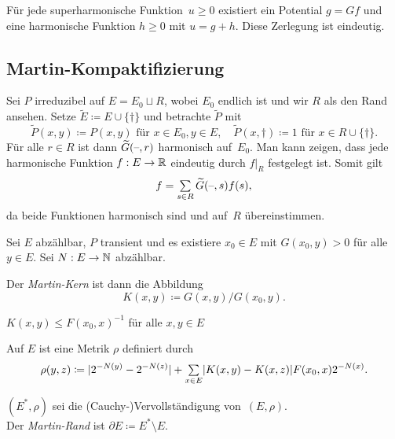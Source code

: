 \documentclass{cheat-sheet}
\begin{document}
\begin{satz}
  Für jede superharmonische Funktion~$u \geq 0$ existiert ein Potential $g = G f$ und eine harmonische Funktion $h \geq 0$ mit $u = g + h$.
  Diese Zerlegung ist eindeutig.
\end{satz}

\subsection{Martin-Kompaktifizierung}

\begin{bsp}
  Sei $P$ irreduzibel auf $E = E_0 \sqcup R$, wobei $E_0$ endlich ist und wir $R$ als den Rand ansehen.
  Setze $\widetilde{E} \coloneqq E \cup \{ \dagger \}$ und betrachte $\widetilde{P}$ mit
  \[
    \widetilde{P}(x, y) \coloneqq P(x, y) \text{ für } x \in E_0, y \in E, \quad
    \widetilde{P}(x, \dagger) \coloneqq 1 \text{ für } x \in R \cup \{ \dagger \}.
  \]
  Für alle $r \in R$ ist dann $\widetilde{G}(\text{--}, r)$ harmonisch auf~$E_0$.
  Man kann zeigen, dass jede harmonische Funktion $f : E \to \mathbb{R}$ eindeutig durch $f|_R$ festgelegt ist.
  Somit gilt
  \[
    f = \sum_{s \in R} \widetilde{G}(\blank, s) f(s),
  \]
  da beide Funktionen harmonisch sind und auf~$R$ übereinstimmen.
\end{bsp}

\begin{situation}
  Sei $E$ abzählbar, $P$ transient und es existiere $x_0 \in E$ mit $G(x_0, y) > 0$ für alle $y \in E$.
  Sei $N : E \to \mathbb{N}$ abzählbar.
\end{situation}

\begin{defn}
  Der \emph{Martin-Kern} ist dann die Abbildung
  \[
    K(x, y) \coloneqq G(x, y) / G(x_0, y).
  \]
\end{defn}

\begin{lem}
  $K(x, y) \leq F(x_0, x)^{-1}$ für alle $x, y \in E$
\end{lem}

\begin{defn}
  Auf $E$ ist eine Metrik $\rho$ definiert durch
  \[
    \rho(y, z) \coloneqq \abs{2^{-N(y)} - 2^{-N(z)}} + \sum_{x \in E} \abs{K(x, y) - K(x, z)} F(x_0, x) 2^{-N(x)}.
  \]
\end{defn}

\begin{defn}
  \begin{minipage}[t]{0.85 \linewidth}
    $(E^*, \rho)$ sei die (Cauchy-)Vervollständigung von~$(E, \rho)$. \\
    Der \emph{Martin-Rand} ist $\partial E \coloneqq E^* \setminus E$.
  \end{minipage}
\end{defn}
\end{document}
